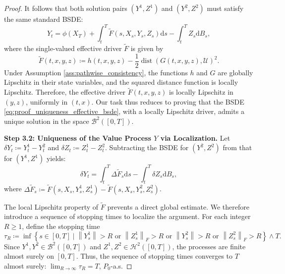 \documentclass[12pt, letterpaper]{amsart}
\newcommand{\Ucal}{\mathcal{U}}
\newcommand{\Bcal}{\mathcal{B}}
\newcommand{\Hcalp}[1]{\mathcal{H}^{#1}}
\newcommand{\dd}{\mathrm{d}}
\newcommand{\norm}[1]{\left\lVert#1\right\rVert}
\DeclareMathOperator*{\dist}{dist}
\theoremstyle{plain}
\theoremstyle{definition}
\theoremstyle{remark}
\numberwithin{equation}{section} %
\begin{document}
\begin{proof}
It follows that both solution pairs \((Y^1, Z^1)\) and \((Y^2, Z^2)\) must satisfy the same standard BSDE:
\begin{equation} \label{eq:proof_uniqueness_effective_bsde}
    Y_t = \phi(X_T) + \int_t^T \tilde{F}(s, X_s, Y_s, Z_s) \dd s - \int_t^T Z_s \dd B_s,
\end{equation}
where the single-valued effective driver \(\tilde{F}\) is given by
\[ \tilde{F}(t,x,y,z) \coloneqq h(t,x,y,z) - \frac{1}{2}\dist(G(t,x,y,z), \Ucal)^2. \]
Under Assumption \ref{ass:pathwise_consistency}, the functions $h$ and $G$ are globally Lipschitz in their state variables, and the squared distance function is locally Lipschitz. Therefore, the effective driver $\tilde{F}(t,x,y,z)$ is locally Lipschitz in $(y,z)$, uniformly in $(t,x)$. Our task thus reduces to proving that the BSDE \eqref{eq:proof_uniqueness_effective_bsde}, with a locally Lipschitz driver, admits a unique solution in the space $\Bcal^2([0,T])$.

\vspace{1ex}
\noindent\textbf{Step 3.2: Uniqueness of the Value Process $Y$ via Localization.}
Let \(\delta Y_t \coloneqq Y^1_t - Y^2_t\) and \(\delta Z_t \coloneqq Z^1_t - Z^2_t\). Subtracting the BSDE for $(Y^2, Z^2)$ from that for $(Y^1, Z^1)$ yields:
\begin{equation} \label{eq:proof_deltaY_bsde}
    \delta Y_t = \int_t^T \Delta \tilde{F}_s \dd s - \int_t^T \delta Z_s \dd B_s,
\end{equation}
where $\Delta \tilde{F}_s \coloneqq \tilde{F}(s, X_s, Y^1_s, Z^1_s) - \tilde{F}(s, X_s, Y^2_s, Z^2_s)$.

The local Lipschitz property of $\tilde{F}$ prevents a direct global estimate. We therefore introduce a sequence of stopping times to localize the argument. For each integer \(R \ge 1\), define the stopping time
\[
    \tau_R \coloneqq \inf \left\{ s \in [0,T] \mid \norm{Y^1_s} > R \text{ or } \norm{Z^1_s}_F > R \text{ or } \norm{Y^2_s} > R \text{ or } \norm{Z^2_s}_F > R \right\} \wedge T.
\]
Since \(Y^1, Y^2 \in \Bcal^2([0,T])\) and \(Z^1, Z^2 \in \Hcalp{2}([0,T])\), the processes are finite almost surely on $[0,T]$. Thus, the sequence of stopping times converges to \(T\) almost surely: \(\lim_{R\to\infty} \tau_R = T\), $P_0$-a.s.


\end{proof}
\end{document}
